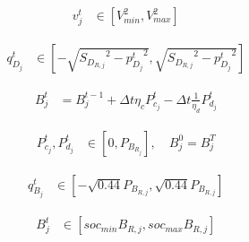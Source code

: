 \vspace{-2.0em}

\begin{align}
    { v^{t}_{j} } &\in { \left[ V^{2}_{min}, V^{2}_{max} \right]} \label{eq:lim_vj_enapp} &&
\end{align}

\vspace{-1.5em}

\begin{align}
    { q^{t}_{D_{j}} } 
    &\in
    { \left[-\sqrt{ {S_{D_{R, j}}}^2 - {p^{t}_{D_{j}}}^2}, \sqrt{ {S_{D_{R, j}}}^2 - {p^{t}_{D_{j}}}^2}\right] } \label{eq:qDj_enapp} &&
\end{align}

\vspace{-1.5em}

\begin{align}
    {B_{j}^{t}} &= {B_{j}^{t-1} + \Delta t  \eta_c P_{c_j}^t - \Delta t\frac{1}{\eta_d} P_{d_j}^t } \label{eq:SOC-j_enapp} &&
\end{align}

\vspace{-1.5em}

\begin{align}
    { P^{t}_{c_{j}}, P^{t}_{d_{j}} }
    &\in
    { \left[ 0, P_{B_{R_{j}}} \right]}, \quad B_{j}^{0}=B_{j}^{T} \label{eq:lim_PcPdj_enapp} &&
\end{align}

\vspace{-1.5em}

\begin{align}
    { q^{t}_{B_{j}} } 
    &\in 
    { \left[-\sqrt{0.44}P_{B_{R, j}}, \sqrt{0.44}P_{B_{R, j}}\right] } \label{eq:qBj_enapp} &&
\end{align}

\vspace{-1.5em}

\begin{align}
    { B^{t}_{j} } &\in { \left[ soc_{min}B_{R, j}, soc_{max}B_{R, j} \right] } \label{eq:modelEndsHere-and-lim_Bj_enapp} &&
\end{align}

